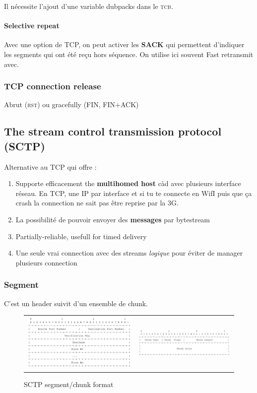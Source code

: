 Il nécessite l'ajout d'une variable dubpacks dans le \textsc{tcb}.

\paragraph{Selective repeat}
Avec une option de TCP, on peut activer les \textbf{SACK} qui permettent d'indiquer
les segments qui ont été reçu hors séquence. On utilise ici souvent Fast retransmit avec.

\subsubsection{TCP connection release}
Abrut (\textsc{rst}) ou gracefully (FIN, FIN+ACK)

\subsection{The stream control transmission protocol (SCTP) }
Alternative au TCP qui offre :
\begin{enumerate}
    \item Supporte efficacement the \textbf{multihomed host} càd avec plusieurs interface réseau. En TCP, une IP par interface et si tu te connecte en WifI puis que ça
        crash la connection ne sait pas être reprise par la 3G.
    \item La possibilité de pouvoir envoyer des \textbf{messages} par bytestream
    \item Partially-reliable, usefull for timed delivery
    \item Une seule vrai connection avec des streams \textit{logique} pour éviter de manager
        plusieurs connection
\end{enumerate}

\subsubsection{Segment}
C'est un header suivit d'un ensemble de chunk.
\begin{figure}[h]
    \centering
    \begin{tabular}{m{8cm}m{7cm}}
        \includegraphics[width=8cm]{sctpsegment.png} &
        \includegraphics[width=7cm]{sctpchunk.png}
    \end{tabular}
    \caption{SCTP segment/chunk format}
\end{figure}

